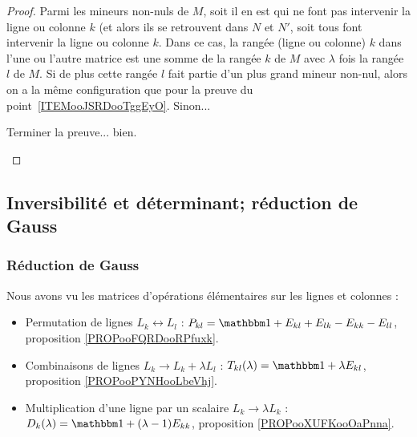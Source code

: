 \begin{proof}
    \item[\ref{ITEMooRangsTransvections}]
      Parmi les mineurs non-nuls de \( M \), soit il en est qui ne font pas intervenir la ligne ou colonne \( k \) (et alors ils se retrouvent dans \( N \) et \( N' \), soit tous font intervenir la ligne ou colonne \( k \). Dans ce cas, la rangée (ligne ou colonne) \( k \) dans l'une ou l'autre matrice est une somme de la rangée \( k \) de \( M \) avec \( \lambda \) fois la rangée \( l \) de \( M \). Si de plus cette rangée \( l \) fait partie d'un plus grand mineur non-nul, alors on a la même configuration que pour la preuve du point~\ref{ITEMooJSRDooTggEyO}. Sinon... \begin{probleme}Terminer la preuve... bien. \end{probleme}
\end{proof}

\subsection{Inversibilité et déterminant; réduction de Gauss}

\subsubsection{Réduction de Gauss}


Nous avons vu les matrices d'opérations élémentaires sur les lignes et colonnes :
\begin{itemize}
    \item Permutation de lignes \( L_k\leftrightarrow L_l\)  : \( P_{kl}=\mtu+E_{kl}+E_{lk}-E_{kk}-E_{ll}\), proposition \ref{PROPooFQRDooRPfuxk}.
    \item Combinaisons de lignes \( L_k\to L_k+\lambda L_l\) : \( T_{kl} (\lambda)=\mtu+\lambda E_{kl}\), proposition \ref{PROPooPYNHooLbeVhj}.
    \item Multiplication d'une ligne par un scalaire \( L_k\to \lambda L_k\) : \( D_k(\lambda) =\mtu+(\lambda-1)E_{kk}\), proposition \ref{PROPooXUFKooOaPnna}.
\end{itemize}

